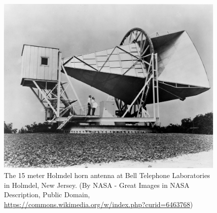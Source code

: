 \documentclass{article}
\begin{document}
\begin{figure}
\includegraphics[width=\textwidth]{Horn_Antenna.jpeg}
\caption{The 15 meter Holmdel horn antenna at Bell Telephone Laboratories in Holmdel, New Jersey.
(By NASA - Great Images in NASA Description, Public Domain, \url{https://commons.wikimedia.org/w/index.php?curid=6463768})}
\end{figure}
\end{document}
